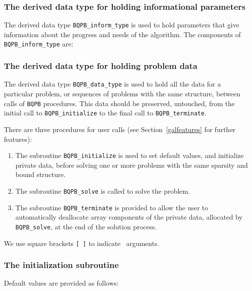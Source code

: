 \documentclass{galahad}
\newcommand{\packagename}{BQPB}
\begin{document}

\subsubsection{The derived data type for holding informational
 parameters}\label{typeinform}
The derived data type
{\tt \packagename\_inform\_type}
is used to hold parameters that give information about the progress and needs
of the algorithm. The components of
{\tt \packagename\_inform\_type}
are:




\subsubsection{The derived data type for holding problem data}\label{typedata}
The derived data type
{\tt \packagename\_data\_type}
is used to hold all the data for a particular problem,
or sequences of problems with the same structure, between calls of
{\tt \packagename} procedures.
This data should be preserved, untouched, from the initial call to
{\tt \packagename\_initialize}
to the final call to
{\tt \packagename\_terminate}.


\galarguments
There are three procedures for user calls
(see Section~\ref{galfeatures} for further features):

\begin{enumerate}
\item The subroutine
      {\tt \packagename\_initialize}
      is used to set default values, and initialize private data,
      before solving one or more problems with the
      same sparsity and bound structure.
\item The subroutine
      {\tt \packagename\_solve}
      is called to solve the problem.
\item The subroutine
      {\tt \packagename\_terminate}
      is provided to allow the user to automatically deallocate array
       components of the private data, allocated by
       {\tt \packagename\_solve},
       at the end of the solution process.
\end{enumerate}
We use square brackets {\tt [ ]} to indicate \optional\ arguments.


\subsubsection{The initialization subroutine}\label{subinit}
 Default values are provided as follows:
\vspace*{1mm}
\end{document}
